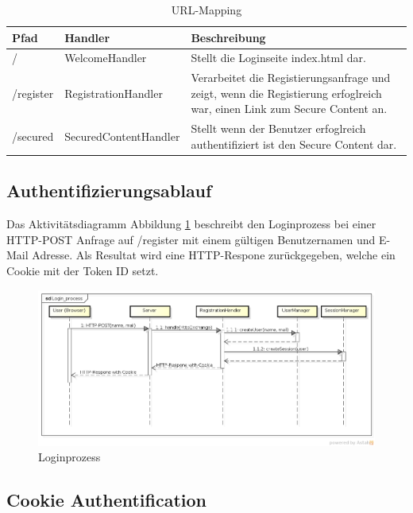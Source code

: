 \begin{table}[H]
\begin{center}
\begin{tabular}{l l p{7cm} }
\hline
\textbf{Pfad} & \textbf{Handler}    & \textbf{Beschreibung} \\ \hline \hline
/             & WelcomeHandler          & Stellt die Loginseite index.html dar.\\
/register     & RegistrationHandler     & Verarbeitet die Registierungsanfrage und zeigt, wenn die Registierung erfoglreich war, einen Link zum Secure Content an. \\
/secured      & SecuredContentHandler   & Stellt wenn der Benutzer erfoglreich authentifiziert ist den Secure Content dar.\\
\hline \hline
\end{tabular}
\caption{URL-Mapping}
\label{tab:url-mapping}
\end{center}
\end{table}

\subsection{Authentifizierungsablauf}

Das Aktivitätsdiagramm Abbildung \ref{fig:process} beschreibt den Loginprozess bei einer HTTP-POST Anfrage auf /register mit einem gültigen Benutzernamen und E-Mail Adresse.
Als Resultat wird eine HTTP-Respone zurückgegeben, welche ein Cookie mit der Token ID setzt.

\begin{figure}[H]
	\begin{center}
		\includegraphics[width=1.0\textwidth]{./content/Login_process.png}
	\end{center}
	\caption{Loginprozess}
	\label{fig:process}
\end{figure}

\subsection{Cookie Authentification}

